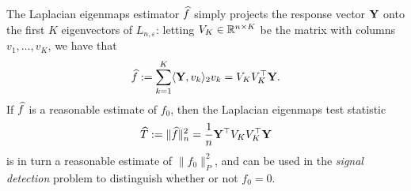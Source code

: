 The Laplacian eigenmaps estimator $\widehat{f}$ simply projects the response vector ${\bf Y}$ onto the first $K$ eigenvectors of $L_{n,\varepsilon}$: letting $V_K \in \mathbb{R}^{n \times K}$ be the matrix with columns $v_1,\ldots,v_K$, we have that
\begin{equation}
\label{eqn:laplacian_eigenmaps_estimator}
\widehat{f} := \sum_{k = 1}^{K} \langle {\bf Y}, v_k \rangle_{2} v_k = V_K V_K^{\top} {\bf Y}.
\end{equation} 
If $\widehat{f}$ is a reasonable estimate of $f_0$, then the Laplacian eigenmaps test statistic
\begin{equation}
\label{eqn:laplacian_eigenmaps_test}
\widehat{T} := \|\widehat{f}\|_n^2 = \frac{1}{n} {\bf Y}^{\top} V_K V_K^{\top} {\bf Y}
\end{equation}
is in turn a reasonable estimate of $\|f_0\|_{P}^2$, and can be used in the \emph{signal detection} problem to distinguish whether or not $f_0 = 0$.


